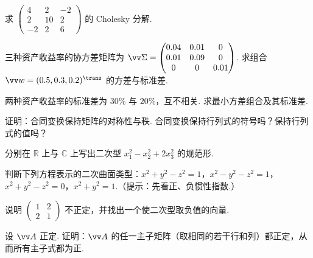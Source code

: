 {\begin{exA}
			\item\label{ex:quad:A13} 求 $\begin{pmatrix}4&2&-2\\2&10&2\\-2&2&6\end{pmatrix}$ 的 Cholesky 分解.
			\item\label{ex:quad:A14} 三种资产收益率的协方差矩阵为 $\vv\Sigma=\begin{pmatrix}0.04&0.01&0\\0.01&0.09&0\\0&0&0.01\end{pmatrix}$. 求组合 $\vv w=(0.5,0.3,0.2)^\trans$ 的方差与标准差.
			\item\label{ex:quad:A15} 两种资产收益率的标准差为 $30\%$ 与 $20\%$，互不相关. 求最小方差组合及其标准差.
			\item\label{ex:quad:A16} 证明：合同变换保持矩阵的对称性与秩. 合同变换保持行列式的符号吗？保持行列式的值吗？
			\item\label{ex:quad:A17} 分别在 $\mathbb{R}$ 上与 $\mathbb{C}$ 上写出二次型 $x_1^2-x_2^2+2x_3^2$ 的规范形.
			\item\label{ex:quad:A18} 判断下列方程表示的二次曲面类型：$x^2+y^2-z^2=1$，$x^2-y^2-z^2=1$，$x^2+y^2-z^2=0$，$x^2+y^2=1$.（提示：先看正、负惯性指数.）
			\item\label{ex:quad:A19} 说明 $\begin{pmatrix}1&2\\2&1\end{pmatrix}$ 不正定，并找出一个使二次型取负值的向量.
			\item\label{ex:quad:A20} 设 $\vv A$ 正定. 证明：$\vv A$ 的任一主子矩阵（取相同的若干行和列）都正定，从而所有主子式都为正.
		\end{exA}
		
}
